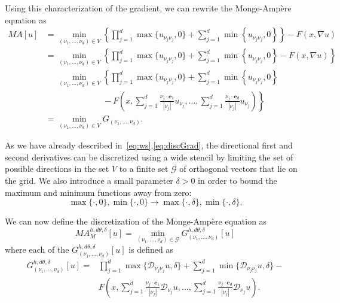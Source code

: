 \documentclass{amsart}
\theoremstyle{lemma}
\theoremstyle{remark}
\begin{document}
Using this characterization of the gradient,  we can rewrite the {{Monge-Amp\`ere}\xspace} equation as
\begin{align*}
MA[u]&= 
	\min\limits_{(\nu_1,\ldots,\nu_d)\in V}\left\{ \prod\limits_{j=1}^d \max\{u_{\nu_j\nu_j},0\} + \sum\limits_{j=1}^d\min\left\{u_{\nu_j\nu_j},0\right\}\right\}-F(x,\nabla u)\\
	&=\min\limits_{(\nu_1,\ldots,\nu_d)\in V}\left\{ \prod\limits_{j=1}^d \max\{u_{\nu_j\nu_j},0\} + \sum\limits_{j=1}^d\min\left\{u_{\nu_j\nu_j},0\right\} - F(x,\nabla u)\right\}\\
	&\phantom{=}\min\limits_{(\nu_1,\ldots,\nu_d)\in V}\left\{ \prod\limits_{j=1}^d \max\{u_{\nu_j\nu_j},0\} + \sum\limits_{j=1}^d\min\left\{u_{\nu_j\nu_j},0\right\} \right.\\
	&\phantom{=\min\limits_{(\nu_1,\ldots,\nu_d)\in V}}- \left.F\left(x,\sum\limits_{j=1}^d\frac{\nu_j\cdot {\mathbf{e}}_1}{{\left\vert{\nu_j}\right\vert}}u_{\nu_j},\ldots,\sum\limits_{j=1}^d\frac{\nu_j\cdot {\mathbf{e}}_d}{{\left\vert{\nu_j}\right\vert}}u_{\nu_j}\right)\right\}\\
  &= \min\limits_{(\nu_1,\ldots,\nu_d)\in V} G_{(\nu_1,\ldots,\nu_d)}.
\end{align*}

As we have already described in~\eqref{eq:ws},\eqref{eq:discGrad}, the directional first and second derivatives can be discretized using a wide stencil by limiting the set of possible directions in the set $V$ to a finite set ${\mathcal{G}}$ of orthogonal vectors that lie on the grid.  We also introduce a small parameter $\delta>0$ in order to bound the maximum and minimum functions away from zero:
\[ \max\{\cdot,0\},\min\{\cdot,0\} \to  \max\{\cdot,\delta\},\min\{\cdot,\delta\}.\]

We can now define the discretization of the {{Monge-Amp\`ere}\xspace} equation as
\begin{equation}\label{eq:MAmonDisc}
MA_M^{h,d\theta,\delta}[u] 
  = \min\limits_{(\nu_1,\ldots,\nu_d)\in {\mathcal{G}}}G_{(\nu_1,\ldots,\nu_d)}^{h,d\theta,\delta}[u]
\end{equation}
where each of the $G_{(\nu_1,\ldots,\nu_d)}^{h,d\theta,\delta}[u]$ is defined as
\begin{equation}\label{eq:monterm}
\begin{split}
G_{(\nu_1,\ldots,\nu_d)}^{h,d\theta,\delta}[u] = &\prod\limits_{j=1}^d\max\{{\mathcal{D}}_{\nu_j\nu_j}u,\delta\} + 
\sum\limits_{j=1}^d\min\{{\mathcal{D}}_{\nu_j\nu_j}u,\delta\} - \\
&F\left(x,\sum\limits_{j=1}^d\frac{\nu_j\cdot {\mathbf{e}}_1}{{\left\vert{\nu_j}\right\vert}}{\mathcal{D}}_{\nu_j}u,\ldots,\sum\limits_{j=1}^d\frac{\nu_j\cdot {\mathbf{e}}_d}{{\left\vert{\nu_j}\right\vert}}{\mathcal{D}}_{\nu_j}u\right).
\end{split}
\end{equation}
\end{document}
